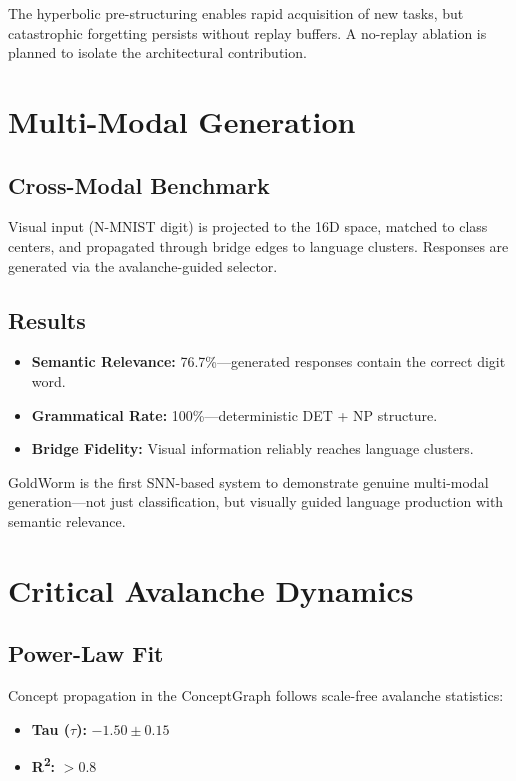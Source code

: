 \documentclass[conference]{IEEEtran}
\begin{document}
The hyperbolic pre-structuring enables rapid acquisition of new tasks, but catastrophic forgetting persists without replay buffers. A no-replay ablation is planned to isolate the architectural contribution.

\section{Multi-Modal Generation}

\subsection{Cross-Modal Benchmark}
Visual input (N-MNIST digit) is projected to the 16D space, matched to class centers, and propagated through bridge edges to language clusters. Responses are generated via the avalanche-guided selector.

\subsection{Results}
\begin{itemize}
    \item \textbf{Semantic Relevance:} 76.7\%---generated responses contain the correct digit word.
    \item \textbf{Grammatical Rate:} 100\%---deterministic DET + NP structure.
    \item \textbf{Bridge Fidelity:} Visual information reliably reaches language clusters.
\end{itemize}

GoldWorm is the first SNN-based system to demonstrate genuine multi-modal generation---not just classification, but visually guided language production with semantic relevance.

\section{Critical Avalanche Dynamics}

\subsection{Power-Law Fit}
Concept propagation in the ConceptGraph follows scale-free avalanche statistics:
\begin{itemize}
    \item \textbf{Tau ($\tau$):} $-1.50 \pm 0.15$
    \item \textbf{R\textsuperscript{2}:} $> 0.8$
\end{itemize}
\end{document}
